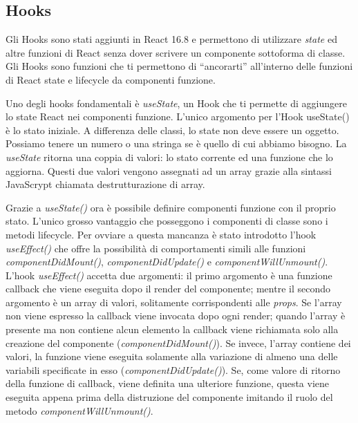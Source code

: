 \subsection{Hooks}
\label{sec:hooks}

Gli Hooks sono stati aggiunti in React 16.8 e permettono di utilizzare \textit{state} ed altre funzioni di React senza dover scrivere un componente sottoforma di classe. Gli Hooks sono funzioni che ti permettono di “ancorarti” all’interno delle funzioni di React state e lifecycle da componenti funzione. 

Uno degli hooks fondamentali è \textit{useState}, un Hook che ti permette di aggiungere lo state React nei componenti funzione. L’unico argomento per l’Hook useState() è lo stato iniziale. A differenza delle classi, lo state non deve essere un oggetto. Possiamo tenere un numero o una stringa se è quello di cui abbiamo bisogno. La \textit{useState} ritorna una coppia di valori: lo stato corrente ed una funzione che lo aggiorna. Questi due valori vengono assegnati ad un array grazie alla sintassi JavaScrypt chiamata destrutturazione di array.



Grazie a \textit{useState()} ora è possibile definire componenti funzione con il proprio stato. L'unico grosso vantaggio che posseggono i componenti di classe sono i metodi lifecycle. Per ovviare a questa mancanza è stato introdotto l'hook \textit{useEffect()} che offre la possibilità di comportamenti simili alle funzioni \textit{componentDidMount()}, \textit{componentDidUpdate()} e \textit{componentWillUnmount()}.
L'hook \textit{useEffect()} accetta due argomenti: il primo argomento è una funzione callback che viene eseguita  dopo il render del componente; mentre il secondo argomento è un array di valori, solitamente corrispondenti alle \textit{props}. Se l'array non viene espresso la callback viene invocata dopo ogni render; quando l'array è presente ma non contiene alcun elemento la callback viene richiamata solo alla creazione del componente (\textit{componentDidMount()}). Se invece, l'array contiene dei valori, la funzione viene eseguita solamente alla variazione di almeno una delle variabili specificate in esso (\textit{componentDidUpdate()}). Se, come valore di ritorno della funzione di callback, viene definita una ulteriore funzione, questa viene eseguita appena prima della distruzione del componente imitando il ruolo del metodo \textit{componentWillUnmount()}.

